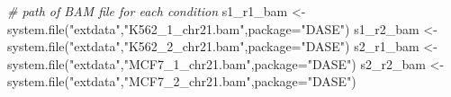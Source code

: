 \documentclass[
]{article}
\newenvironment{Shaded}{\begin{snugshade}}{\end{snugshade}}
\newcommand{\AttributeTok}[1]{\textcolor[rgb]{0.77,0.63,0.00}{#1}}
\newcommand{\CommentTok}[1]{\textcolor[rgb]{0.56,0.35,0.01}{\textit{#1}}}
\newcommand{\FunctionTok}[1]{\textcolor[rgb]{0.00,0.00,0.00}{#1}}
\newcommand{\NormalTok}[1]{#1}
\newcommand{\OtherTok}[1]{\textcolor[rgb]{0.56,0.35,0.01}{#1}}
\newcommand{\StringTok}[1]{\textcolor[rgb]{0.31,0.60,0.02}{#1}}
\begin{document}
\begin{Shaded}
\begin{Highlighting}[]
\CommentTok{\# path of BAM file for each condition}
\NormalTok{s1\_r1\_bam }\OtherTok{\textless{}{-}} \FunctionTok{system.file}\NormalTok{(}\StringTok{"extdata"}\NormalTok{,}\StringTok{"K562\_1\_chr21.bam"}\NormalTok{,}\AttributeTok{package=}\StringTok{"DASE"}\NormalTok{)}
\NormalTok{s1\_r2\_bam }\OtherTok{\textless{}{-}} \FunctionTok{system.file}\NormalTok{(}\StringTok{"extdata"}\NormalTok{,}\StringTok{"K562\_2\_chr21.bam"}\NormalTok{,}\AttributeTok{package=}\StringTok{"DASE"}\NormalTok{)}
\NormalTok{s2\_r1\_bam }\OtherTok{\textless{}{-}} \FunctionTok{system.file}\NormalTok{(}\StringTok{"extdata"}\NormalTok{,}\StringTok{"MCF7\_1\_chr21.bam"}\NormalTok{,}\AttributeTok{package=}\StringTok{"DASE"}\NormalTok{)}
\NormalTok{s2\_r2\_bam }\OtherTok{\textless{}{-}} \FunctionTok{system.file}\NormalTok{(}\StringTok{"extdata"}\NormalTok{,}\StringTok{"MCF7\_2\_chr21.bam"}\NormalTok{,}\AttributeTok{package=}\StringTok{"DASE"}\NormalTok{)}


\end{Highlighting}
\end{Shaded}
\end{document}
